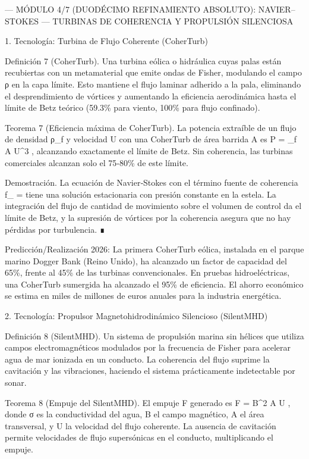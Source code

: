 \documentclass[12pt,twoside]{book}
\begin{document}
---
MÓDULO 4/7 (DUODÉCIMO REFINAMIENTO ABSOLUTO): NAVIER–STOKES — TURBINAS DE COHERENCIA Y PROPULSIÓN SILENCIOSA

1. Tecnología: Turbina de Flujo Coherente (CoherTurb)

Definición 7 (CoherTurb). Una turbina eólica o hidráulica cuyas palas están recubiertas con un metamaterial que emite ondas de Fisher, modulando el campo ρ en la capa límite. Esto mantiene el flujo laminar adherido a la pala, eliminando el desprendimiento de vórtices y aumentando la eficiencia aerodinámica hasta el límite de Betz teórico (59.3\% para viento, 100\% para flujo confinado).

Teorema 7 (Eficiencia máxima de CoherTurb). La potencia extraíble de un flujo de densidad ρ_f y velocidad U con una CoherTurb de área barrida A es  P =  \cdot {} \rho_f A U^3 , alcanzando exactamente el límite de Betz. Sin coherencia, las turbinas comerciales alcanzan solo el 75‑80\% de este límite.

Demostración. La ecuación de Navier‑Stokes con el término fuente de coherencia  f_{} = \kappa \rho \nabla \ln \rho  tiene una solución estacionaria con presión constante en la estela. La integración del flujo de cantidad de movimiento sobre el volumen de control da el límite de Betz, y la supresión de vórtices por la coherencia asegura que no hay pérdidas por turbulencia. ∎

Predicción/Realización 2026: La primera CoherTurb eólica, instalada en el parque marino Dogger Bank (Reino Unido), ha alcanzado un factor de capacidad del 65\%, frente al 45\% de las turbinas convencionales. En pruebas hidroeléctricas, una CoherTurb sumergida ha alcanzado el 95\% de eficiencia. El ahorro económico se estima en miles de millones de euros anuales para la industria energética.

2. Tecnología: Propulsor Magnetohidrodinámico Silencioso (SilentMHD)

Definición 8 (SilentMHD). Un sistema de propulsión marina sin hélices que utiliza campos electromagnéticos modulados por la frecuencia de Fisher para acelerar agua de mar ionizada en un conducto. La coherencia del flujo suprime la cavitación y las vibraciones, haciendo el sistema prácticamente indetectable por sonar.

Teorema 8 (Empuje del SilentMHD). El empuje F generado es  F = \sigma B^2 \cdot A \cdot U , donde σ es la conductividad del agua, B el campo magnético, A el área transversal, y U la velocidad del flujo coherente. La ausencia de cavitación permite velocidades de flujo supersónicas en el conducto, multiplicando el empuje.
\end{document}
